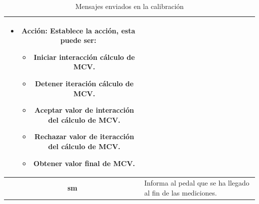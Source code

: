 \begin{table}[h]
\begin{tabular}{ |c|p{14cm}|}
\begin{minipage}{14cm}
\begin{itemize}
                                    \item \textbf{Acción}: Establece la acción, esta puede ser: 
                                    \begin{itemize}
                                        \item Iniciar interacción cálculo de MCV.
                                        \item Detener iteración cálculo de MCV.
                                        \item Aceptar valor de interacción del cálculo de MCV.
                                        \item Rechazar valor de iteracción del cálculo de MCV.
                                        \item Obtener valor final de MCV.
                                    \end{itemize}
                                \end{itemize} 
                                \vspace{1pt}
                            \end{minipage}\\\hline
        \textbf{sm}     &   Informa al pedal que se ha llegado al fin de las mediciones. \\\hline               

    \end{tabular}
    \caption{Mensajes enviados en la calibración}
    \label{table:send-msg-in-calibration}
\end{table}  

